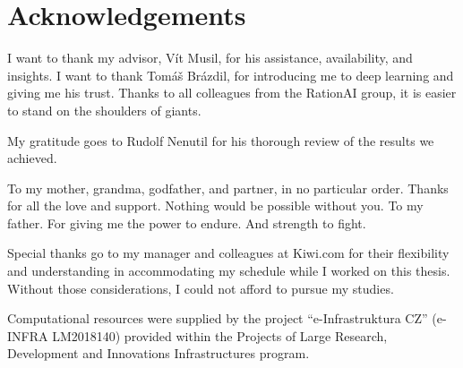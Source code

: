 \chapter*{Acknowledgements}

I want to thank my advisor, Vít Musil, for his assistance, availability, and insights.
I want to thank Tomáš Brázdil, for introducing me to deep learning and giving me his trust.
Thanks to all colleagues from the RationAI group, it is easier to stand on the shoulders of giants.

My gratitude goes to Rudolf Nenutil for his thorough review of the results we achieved.

To my mother, grandma, godfather, and partner, in no particular order.
Thanks for all the love and support.
Nothing would be possible without you.
To my father.
For giving me the power to endure.
And strength to fight.

Special thanks go to my manager and colleagues at Kiwi.com for their flexibility and understanding in accommodating my schedule while I worked on this thesis.
Without those considerations, I could not afford to pursue my studies.

Computational resources were supplied by the project ``e-Infrastruktura CZ'' (e-INFRA LM2018140) provided within the Projects of Large Research, Development and Innovations Infrastructures program.
